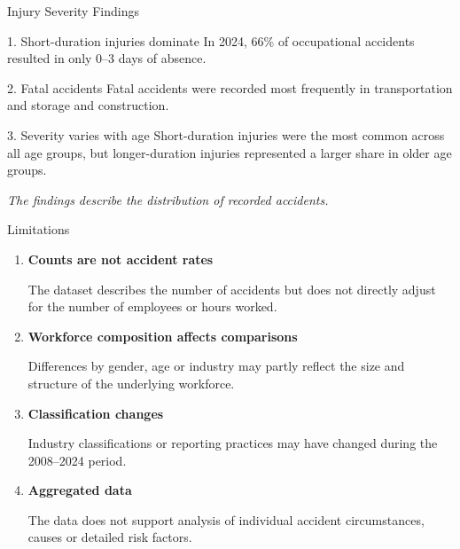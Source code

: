 \documentclass[aspectratio=169]{beamer}
\begin{document}
\begin{frame}{Injury Severity Findings} \small \begin{block}{1. Short-duration injuries dominate} In 2024, \alert{66\%} of occupational accidents resulted in only \alert{0--3 days} of absence. \end{block} \vspace{0.15cm} \begin{block}{2. Fatal accidents} Fatal accidents were recorded most frequently in \alert{transportation and storage} and \alert{construction}. \end{block} \vspace{0.15cm} \begin{block}{3. Severity varies with age} Short-duration injuries were the most common across all age groups, but \alert{longer-duration injuries represented a larger share in older age groups}. \end{block} \vspace{0.15cm} \centering \footnotesize \textit{The findings describe the distribution of recorded accidents.} \end{frame}

\begin{frame}{Limitations}

\begin{enumerate}
    \item \textbf{Counts are not accident rates}

    The dataset describes the number of accidents but does not directly
    adjust for the number of employees or hours worked.

    \item \textbf{Workforce composition affects comparisons}

    Differences by gender, age or industry may partly reflect the size
    and structure of the underlying workforce.

    \item \textbf{Classification changes}

    Industry classifications or reporting practices may have changed
    during the 2008--2024 period.

    \item \textbf{Aggregated data}

    The data does not support analysis of individual accident circumstances,
    causes or detailed risk factors.

\end{enumerate}

\end{frame}
\end{document}

